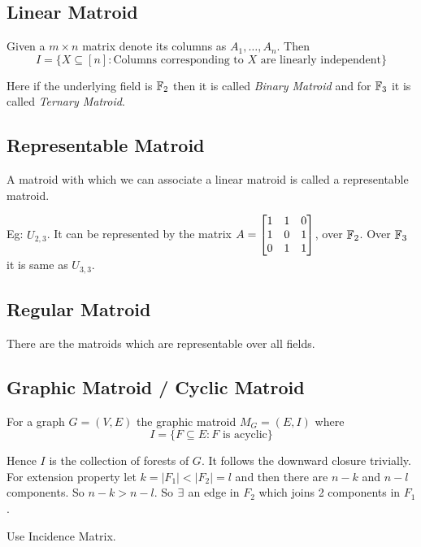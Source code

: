 \subsection{Linear Matroid} Given a $m\times n$ matrix denote its columns as $A_1,\dots, A_n$. Then $$I=\{ X\subseteq [n]\colon \text{Columns corresponding to $X$ are linearly independent}  \}$$\parinn

Here if the underlying field is $\mathbb{F}_2$ then it is called \textit{Binary Matroid} and for $\mathbb{F}_3$ it is called \textit{Ternary Matroid}.

\subsection{Representable Matroid} A matroid with which we can associate a linear matroid is called a representable matroid.

Eg: $U_{2,3}$. It can be represented by the matrix $A=\left[\begin{matrix}1&1&0\\ 1& 0 & 1\\ 0& 1& 1\end{matrix}\right]$, over $\mathbb{F}_2$. Over $\mathbb{F}_3$ it is same as $U_{3,3}$. 

\subsection{Regular Matroid} There are the matroids which are representable over all fields.

\subsection{Graphic Matroid / Cyclic Matroid} For a graph $G=(V,E)$ the graphic matroid $M_G=(E,I)$ where $$I=\{F\subseteq E\colon \text{$F$ is acyclic}\}$$

Hence $I$ is the collection of forests of $G$. It follows the downward closure trivially. For extension property let $k=|F_1|<|F_2|=l$ and then there are $n-k$ and $n-l$ components. So $n-k>n-l$. So $\exists$ an edge in $F_2$ which joins 2 components in $F_1$.
\begin{proof-idea}
	Use Incidence Matrix.
\end{proof-idea}
